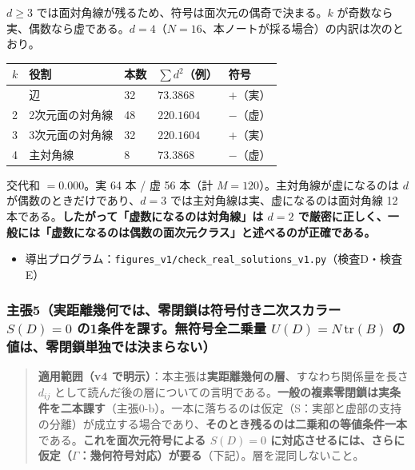 \documentclass[
  10pt,
]{ltjsarticle}
\newcounter{none} %
\providecommand{\tightlist}{%
  \setlength{\itemsep}{0pt}\setlength{\parskip}{0pt}}
\begin{document}
\(d \ge 3\) では面対角線が残るため、符号は面次元の偶奇で決まる。\(k\)
が奇数なら実、偶数なら虚である。\(d=4\)（\(N=16\)、本ノートが採る場合）の内訳は次のとおり。

{\def\LTcaptype{none} %
\begin{longtable}[]{@{}lllll@{}}
\toprule\noalign{}
\(k\) & 役割 & 本数 & \(\sum d^2\)（例） & 符号 \\
\midrule\noalign{}
\endhead
\bottomrule\noalign{}
\endlastfoot
1 & 辺 & 32 & \(73.3868\) & \(+\)（実） \\
2 & 2次元面の対角線 & 48 & \(220.1604\) & \(-\)（虚） \\
3 & 3次元面の対角線 & 32 & \(220.1604\) & \(+\)（実） \\
4 & 主対角線 & 8 & \(73.3868\) & \(-\)（虚） \\
\end{longtable}
}

交代和 \(= 0.000\)。実 64 本 / 虚 56 本（計
\(M = 120\)）。主対角線が虚になるのは \(d\)
が偶数のときだけであり、\(d=3\) では主対角線は実、虚になるのは面対角線
12 本である。\textbf{したがって「虚数になるのは対角線」は \(d=2\)
で厳密に正しく、一般には「虚数になるのは偶数の面次元クラス」と述べるのが正確である。}

\begin{itemize}
\tightlist
\item
  導出プログラム：\texttt{figures\_v1/check\_real\_solutions\_v1.py}（検査D・検査E）
\end{itemize}

\subsubsection{\texorpdfstring{主張5（実距離幾何では、零閉鎖は符号付き二次スカラー
\(S(D)=0\) の1条件を課す。無符号全二乗量 \(U(D)=N\,\mathrm{tr}(B)\)
の値は、零閉鎖単独では決まらない）}{主張5（実距離幾何では、零閉鎖は符号付き二次スカラー S(D)=0 の1条件を課す。無符号全二乗量 U(D)=N\textbackslash,\textbackslash mathrm\{tr\}(B) の値は、零閉鎖単独では決まらない）}}\label{ux4e3bux5f355ux5b9fux8dddux96e2ux5e7eux4f55ux3067ux306fux96f6ux9589ux9396ux306fux7b26ux53f7ux4ed8ux304dux4e8cux6b21ux30b9ux30abux30e9ux30fc-sd0-ux306e1ux6761ux4ef6ux3092ux8ab2ux3059ux7121ux7b26ux53f7ux5168ux4e8cux4e57ux91cf-udnmathrmtrb-ux306eux5024ux306fux96f6ux9589ux9396ux5358ux72ecux3067ux306fux6c7aux307eux3089ux306aux3044}

\begin{quote}
\textbf{適用範囲（v4
で明示）}：本主張は\textbf{実距離幾何の層}、すなわち関係量を長さ
\(d_{ij}\)
として読んだ後の層についての言明である。\textbf{一般の複素零閉鎖は実条件を二本課す}（主張0-b）。一本に落ちるのは仮定（S：実部と虚部の支持の分離）が成立する場合であり、\textbf{そのとき残るのは二乗和の等値条件一本}である。\textbf{これを面次元符号による
\(S(D)=0\)
に対応させるには、さらに仮定（\(\Gamma\)：幾何符号対応）が要る}（下記）。層を混同しないこと。
\end{quote}
\end{document}
